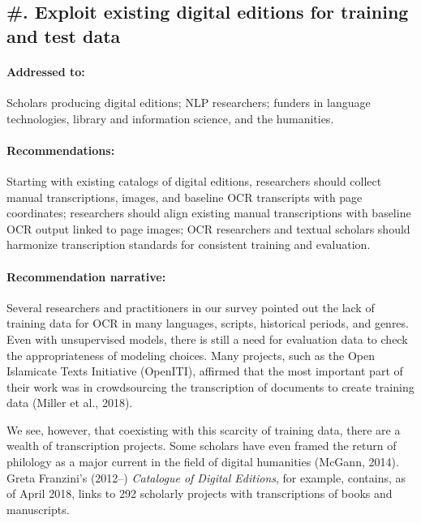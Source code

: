 \documentclass[twoside,11pt]{report}
\newcounter{reccounter}
\renewcommand{\thereccounter}{\arabic{reccounter}}
\newcommand{\recommend}[2]{\refstepcounter{reccounter}%
  \label{rec:#1}%
  \subsection{\#\thereccounter. #2}%
  \label{sec:rec-#1}}
\begin{document}
\recommend{editions}{Exploit existing digital editions for training and test data}

\paragraph{Addressed to:} Scholars producing digital editions; NLP researchers; funders in language technologies, library and information science, and the humanities.

\paragraph{Recommendations:} Starting with existing catalogs of digital editions, researchers should collect manual transcriptions, images, and baseline OCR transcripts with page coordinates; researchers should align existing manual transcriptions with baseline OCR output linked to page images; OCR researchers and textual scholars should harmonize transcription standards for consistent training and evaluation.

\paragraph{Recommendation narrative:}

Several researchers and practitioners in our survey pointed out the lack of training data for OCR in many languages, scripts, historical periods, and genres. Even with unsupervised models, there is still a need for evaluation data to check the appropriateness of modeling choices. Many projects, such as the Open Islamicate Texts Initiative (OpenITI), affirmed that the most important part of their work was in crowdsourcing the transcription of documents to create training data (Miller et al., 2018).

We see, however, that coexisting with this scarcity of training data, there are a wealth of transcription projects. Some scholars have even framed the return of philology as a major current in the field of digital humanities (McGann, 2014). Greta Franzini's (2012--) \emph{Catalogue of Digital Editions}, for example, contains, as of April 2018, links to 292 scholarly projects with transcriptions of books and manuscripts.
\end{document}
